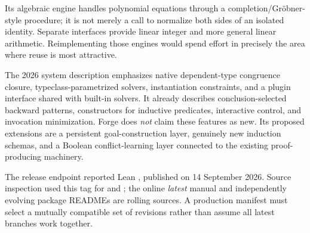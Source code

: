 \documentclass[11pt,letterpaper]{article}
\newcommand{\code}[1]{\texttt{\detokenize{#1}}}
\theoremstyle{definition}\newtheorem{definition}[proposition]{Definition}
\begin{document}
Its algebraic engine handles polynomial equations through a completion/Gr\"obner-style procedure; it is not merely a call to normalize both sides of an isolated identity. Separate interfaces provide linear integer and more general linear arithmetic. Reimplementing those engines would spend effort in precisely the area where reuse is most attractive.~\cite{grindring,grindlia,grindlin}

The 2026 system description emphasizes native dependent-type congruence closure, typeclass-parametrized solvers, instantiation constraints, and a plugin interface shared with built-in solvers. It already describes conclusion-selected backward patterns, constructors for inductive predicates, interactive control, and invocation minimization. Forge does \emph{not} claim these features as new. Its proposed extensions are a persistent goal-construction layer, genuinely new induction schemas, and a Boolean conflict-learning layer connected to the existing proof-producing machinery.~\cite{grindpaper}

The release endpoint reported Lean \code{v4.34.0}, published on 14 September 2026. Source inspection used this tag for \code{Main.lean} and \code{Types.lean}; the online \emph{latest} manual and independently evolving package READMEs are rolling sources. A production manifest must select a mutually compatible set of revisions rather than assume all latest branches work together.~\cite{leanrelease,grindmain,grindtypes}
\end{document}
